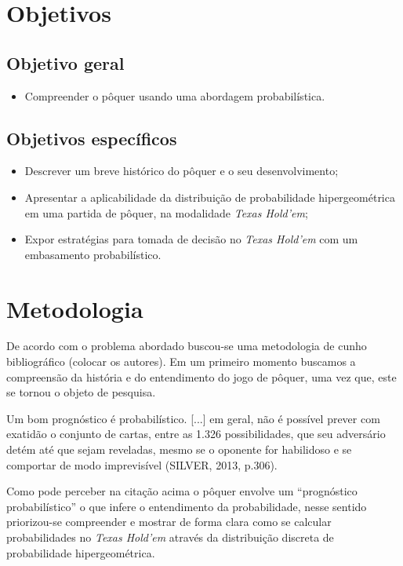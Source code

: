 \documentclass[
	12pt,				%
	oneside,			%
	a4paper,			%
	chapter=TITLE,		%
	section=TITLE,		%
	subsection=Title,	%
	subsubsection=Title,%
	brazil,				%
	]{abntex2}
\begin{document}
\chapter{Objetivos}

\section{Objetivo geral}
\begin{itemize}
	\item Compreender o pôquer usando uma abordagem probabilística.
\end{itemize}

\section{Objetivos específicos}
\begin{itemize}
	\item Descrever um breve histórico do pôquer e o seu desenvolvimento;
	\item Apresentar a aplicabilidade da distribuição de probabilidade hipergeométrica em uma partida de pôquer, na modalidade \textit{Texas Hold'em};
	\item Expor estratégias para tomada de decisão no \textit{Texas Hold'em} com um embasamento probabilístico.
\end{itemize}


\chapter{Metodologia}
De acordo com o problema abordado buscou-se uma metodologia de cunho bibliográfico (colocar os autores). Em um primeiro momento buscamos a compreensão da história e do entendimento do jogo de pôquer, uma vez que, este se tornou o objeto de pesquisa.

\begin{citacao}
Um bom prognóstico é probabilístico. [...] em geral, não é possível prever com exatidão o conjunto de cartas, entre as 1.326 possibilidades, que seu adversário detém até que sejam reveladas, mesmo se o oponente for habilidoso e se comportar de modo imprevisível (SILVER, 2013, p.306).
\end{citacao}     

Como pode perceber na citação acima o pôquer envolve um ``prognóstico probabilístico'' o que infere o entendimento da probabilidade, nesse sentido priorizou-se compreender e mostrar de forma clara como se calcular probabilidades no \textit{Texas Hold'em} através da distribuição discreta de probabilidade hipergeométrica. 
\end{document}
